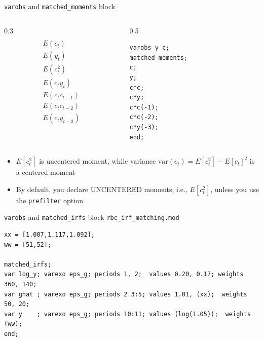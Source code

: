 \begin{frame}[fragile]{\texttt{varobs} and \texttt{matched\_moments} block }

  \begin{columns}
    \begin{column}{0.3\textwidth}
      \begin{align*}
        \\
        E(c_t)         \\
        E(y_t)         \\
        E(c_t^2)       \\
        E(c_t y_t)     \\
        E(c_t c_{t-1}) \\
        E(c_t c_{t-2}) \\
        E(c_t y_{t-3})
      \end{align*}
    \end{column}
    \begin{column}{0.5\textwidth}
\begin{verbatim}
varobs y c;
matched_moments;
c;
y;
c*c;
c*y;
c*c(-1);
c*c(-2);
c*y(-3);
end;
\end{verbatim}
    \end{column}
  \end{columns}
  \begin{itemize}
    \item $E[c_t^2] $ is uncentered moment, while variance $\text{var}(c_t) = E[c_t^2] - E[c_t]^2 $ is a centered moment
    \item By default, you declare UNCENTERED moments, i.e., $E[c_t^2] $, unless you use the \texttt{prefilter} option
  \end{itemize}

\end{frame}

\begin{frame}[fragile]{\texttt{varobs} and \texttt{matched\_irfs} block }{\texttt{rbc\_irf\_matching.mod}}
\small
  \begin{verbatim}
xx = [1.007,1.117,1.092];
ww = [51,52];

matched_irfs; 
var log_y; varexo eps_g; periods 1, 2;  values 0.20, 0.17; weights 360, 140;
var ghat ; varexo eps_g; periods 2 3:5; values 1.01, (xx);  weights 50, 20;
var y    ; varexo eps_g; periods 10:11; values (log(1.05));  weights (ww);
end;
  
\end{verbatim}

\end{frame}



